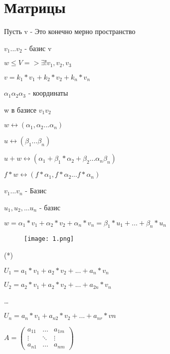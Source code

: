 \section{Матрицы}

Пусть v - Это конечно мерно пространство

$v_1 ... v_2$ - базис v

$w \leq V => \exists! v_1, v_2, v_3$

$v = k_1 * v_1 + k_2 * v_2 + k_n * v_n$

\begin{definition}
    $\alpha_1 \alpha_2 \alpha_3$ - координаты

    w в базисе $v_1 v_2$
\end{definition}


$w \leftrightarrow (\alpha_1, \alpha_2 ... \alpha_n)$

$u \leftrightarrow (\beta_1 ... \beta_n)$

$u + w \leftrightarrow (\alpha_1 + \beta_1 * \alpha_2 + \beta_2 ... \alpha_n \beta_n)$

$f * w \leftrightarrow (f * \alpha_1, f * \alpha_2 ... f * \alpha_n)$


$v_1 ... v_n$ - Базис

$u_1, u_2, ... u_n$ - базис

$w = \alpha_1 * v_1 + \alpha_2 * v_2 + \alpha_n * v_n = \beta_1 * u_1 + ... + \beta_n * u_n$

\begin{figure}[H]
    \centering
    \texttt{[image: 1.png]}
    
    
    \label{fig:1}
\end{figure}

\begin{definition}
    (*)

    $U_1 = a_1 * v_1 + a_2 * v_2 + ... + a_n * v_n$

    $U_2 = a_2 * v_1 + a_2 * v_2 + ... + a_{2n} * v_n$

    \dots

    $U_n = a_n * v_1 + a_{n2} * v_2 + ... + a_{nr} * vn$


\end{definition}



$A = \left(
\begin{array}{ccc}
    a_{11} & \ldots & a_{1m}\\
    \vdots & \ddots & \vdots\\
    a_{n1} &\ldots & a_{nm}
\end{array}
\right)$



